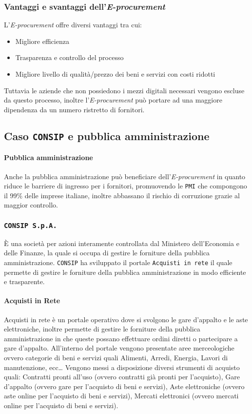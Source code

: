 {{        \subsubsection{Vantaggi e svantaggi dell'\textit{E-procurement}}
            L'\textit{E-procurement} offre diversi vantaggi tra cui:
            \begin{itemize}
                \item Migliore efficienza
                \item Trasparenza e controllo del processo
                \item Migliore livello di qualità/prezzo dei beni e servizi con costi ridotti
            \end{itemize}
            Tuttavia le aziende che non possiedono i mezzi digitali necessari vengono escluse da questo processo, inoltre l'\textit{E-procurement} può portare ad una maggiore dipendenza da un numero ristretto di fornitori.
    \subsection{Caso \texttt{CONSIP} e pubblica amministrazione}
        \paragraph{Pubblica amministrazione} Anche la pubblica amministrazione può beneficiare dell'\textit{E-procurement} in quanto riduce le barriere di ingresso per i fornitori, promuovendo le \texttt{PMI} che compongono il 99\% delle imprese italiane, inoltre abbassano il rischio di corruzione grazie al maggior controllo.
        \subsubsection{\texttt{CONSIP S.p.A.}} 
            È una società per azioni interamente controllata dal Ministero dell'Economia e delle Finanze, la quale si occupa di gestire le forniture della pubblica amministrazione. \texttt{CONSIP} ha sviluppato il portale \texttt{Acquisti in rete} il quale permette di gestire le forniture della pubblica amministrazione in modo efficiente e trasparente.
            \paragraph{Acquisti in Rete} Acquisti in rete è un portale operativo dove si svolgono le gare d'appalto e le aste elettroniche, inoltre permette di gestire le forniture della pubblica amministrazione in che queste possano effettuare ordini diretti o partecipare a gare d'appalto.\newline
            All'interno del portale vengono presentate aree merceologiche ovvero categorie di beni e servizi quali Alimenti, Arredi, Energia, Lavori di manutenzione, ecc\dots
            Vengono messi a disposizione diversi strumenti di acquisto quali: Contratti pronti all'uso (ovvero contratti già pronti per l'acquisto), Gare d'appalto (ovvero gare per l'acquisto di beni e servizi), Aste elettroniche (ovvero aste online per l'acquisto di beni e servizi), Mercati elettronici (ovvero mercati online per l'acquisto di beni e servizi).
}}
